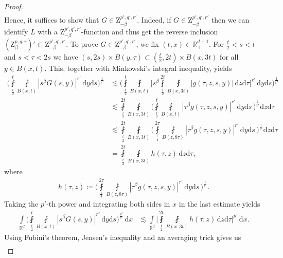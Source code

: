 \documentclass[11pt, leqno,parskip=half]{amsart}
\theoremstyle{definition}
\newcommand{\IR}{\mathbb{R}}
\newcommand{\Z}{\mathrm{Z}}
\renewcommand{\d}{\mathrm{d}}
\numberwithin{equation}{section}
\begin{document}
\begin{proof}
\begin{align*}
    \end{align*}
    Hence, it suffices to show that $G \in \Z^{p',q',r'}_{-\beta}$. Indeed, if $G \in \Z^{p',q',r'}_{-\beta}$ then we can identify $L$ with a $\Z^{p',q',r'}_{-\beta}$-function and thus get the reverse inclusion $({\Z^{p,q,r}_\beta })'\subset \Z^{p',q',r'}_{-\beta}$. To prove $G \in \Z^{p',q',r'}_{-\beta}$, we fix $(t,x)\in \IR^{d+1}_+$. For $\frac{t}{2}< s <t$ and $s<\tau <2s$ we have $(s,2s) \times B(y,\tau) \subset (\frac{t}{2}, 2t) \times B(x,3t)$ for all $y\in B(x,t)$. This, together with Minkowski's integral inequality, yields
    \begin{align*}
        \bigg(\fint\limits_{\frac{t}{2}}^{t} \fint\limits_{B(x,t)} |s^{\beta}G(s,y)|^{r'} \,\d y\d s \bigg)^\frac{1}{{r'}} &\lesssim \bigg(\fint\limits_{\frac{t}{2}}^{t} \fint\limits_{B(x,t)} \bigg|s^{\beta}\fint\limits_{\frac{t}{2}}^{2t} \fint\limits_{B(x,3t)} |g(\tau, z, s, y)| \, \d z \d \tau\bigg|^{r'} \,\d y\d s \bigg)^\frac{1}{r'}\\
        &\lesssim  \fint\limits_{\frac{t}{2}}^{2t} \fint\limits_{B(x,3t)}\bigg(\fint\limits_{\frac{t}{2}}^{t} \fint\limits_{B(x,t)} |\tau^\beta g(\tau, z, s, y)|^{r'} \,\d y\d s  \,\bigg)^\frac{1}{r'} \d z \d \tau\\
        &\lesssim \fint\limits_{\frac{t}{2}}^{2t} \fint\limits_{B(x,3t)}\bigg(\fint\limits_{\frac{\tau}{4}}^{2\tau} \fint\limits_{B(z,8\tau)} |\tau^\beta g(\tau, z, s, y)|^{r'} \,\d y\d s  \,\bigg)^\frac{1}{r'} \d z \d \tau\\
        &= \fint\limits_{\frac{t}{2}}^{2t} \fint\limits_{B(x,3t)} h(\tau,z)\, \d z \d \tau,
    \end{align*}
    where
    \begin{align}
        \label{eq:duality_def_h}
        h(\tau,z) \coloneqq \bigg(\fint\limits_{\frac{\tau}{4}}^{2\tau} \fint\limits_{B(z,8\tau)} |\tau^\beta g(\tau, z, s, y)|^{r'} \,\d y\d s  \,\bigg)^\frac{1}{r'}.
    \end{align}
    Taking the $p'$-th power and integrating both sides in $x$ in the last estimate yields
    \begin{align*}
        \int\limits_{\IR^d}\bigg(\fint\limits_{\frac{t}{2}}^{t} \fint\limits_{B(x,t)} |s^\beta G(s,y)|^{r'} \,\d y\d s \bigg)^\frac{p'}{r'}\,\d x &\lesssim \int\limits_{\IR^d} \bigg|\fint\limits_{\frac{t}{2}}^{2t} \fint\limits_{B(x,3t)} h(\tau,z) \,\d z \d \tau\bigg|^{p'}\, \d x.
    \end{align*}
    Using Fubini's theorem, Jensen's inequality and an averaging trick gives us
    \begin{align*}

\end{align*}
\end{proof}
\end{document}
